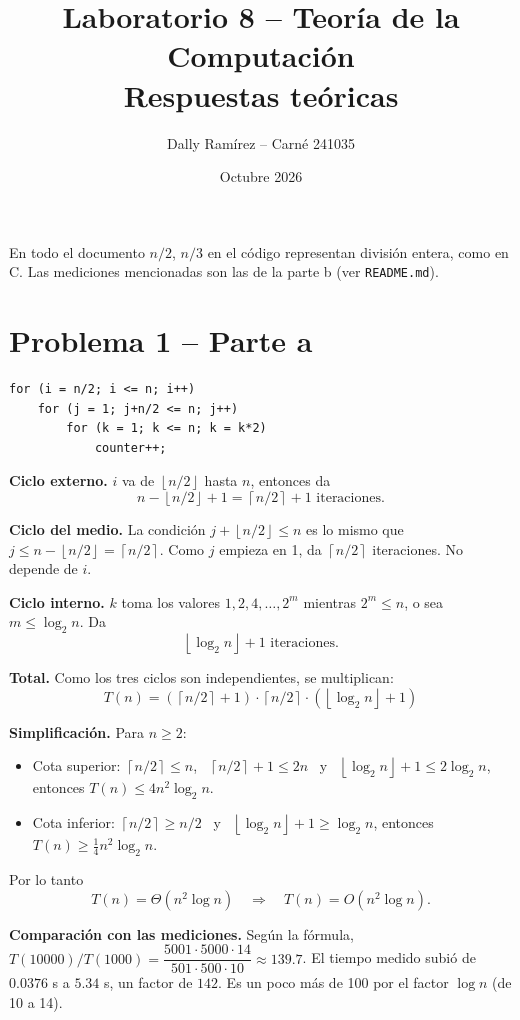\documentclass[11pt]{article}
\title{Laboratorio 8 -- Teoría de la Computación\\\large Respuestas teóricas}
\author{Dally Ramírez -- Carné 241035}
\date{Octubre 2026}
\newcommand{\floor}[1]{\left\lfloor #1 \right\rfloor}
\newcommand{\ceil}[1]{\left\lceil #1 \right\rceil}
\begin{document}
\maketitle

En todo el documento $n/2$, $n/3$ en el código representan división entera, como en C. Las mediciones mencionadas son las de la parte b (ver \texttt{README.md}).

\section*{Problema 1 -- Parte a}

\begin{verbatim}
for (i = n/2; i <= n; i++)
    for (j = 1; j+n/2 <= n; j++)
        for (k = 1; k <= n; k = k*2)
            counter++;
\end{verbatim}

\textbf{Ciclo externo.} $i$ va de $\floor{n/2}$ hasta $n$, entonces da
\[
n - \floor{n/2} + 1 = \ceil{n/2} + 1 \text{ iteraciones.}
\]

\textbf{Ciclo del medio.} La condición $j + \floor{n/2} \le n$ es lo mismo que $j \le n - \floor{n/2} = \ceil{n/2}$. Como $j$ empieza en 1, da $\ceil{n/2}$ iteraciones. No depende de $i$.

\textbf{Ciclo interno.} $k$ toma los valores $1, 2, 4, \dots, 2^m$ mientras $2^m \le n$, o sea $m \le \log_2 n$. Da
\[
\floor{\log_2 n} + 1 \text{ iteraciones.}
\]

\textbf{Total.} Como los tres ciclos son independientes, se multiplican:
\[
T(n) = \left(\ceil{n/2}+1\right)\cdot\ceil{n/2}\cdot\left(\floor{\log_2 n}+1\right)
\]

\textbf{Simplificación.} Para $n \ge 2$:
\begin{itemize}
  \item Cota superior: $\ceil{n/2} \le n$, \ $\ceil{n/2}+1 \le 2n$ \ y \ $\floor{\log_2 n}+1 \le 2\log_2 n$, entonces $T(n) \le 4n^2\log_2 n$.
  \item Cota inferior: $\ceil{n/2} \ge n/2$ \ y \ $\floor{\log_2 n}+1 \ge \log_2 n$, entonces $T(n) \ge \tfrac{1}{4} n^2 \log_2 n$.
\end{itemize}
Por lo tanto
\[
\boxed{T(n) = \Theta(n^2 \log n)} \quad\Rightarrow\quad T(n) = O(n^2\log n).
\]

\textbf{Comparación con las mediciones.} Según la fórmula, $T(10000)/T(1000) = \dfrac{5001\cdot 5000\cdot 14}{501\cdot 500\cdot 10} \approx 139.7$. El tiempo medido subió de $0.0376$ s a $5.34$ s, un factor de $142$. Es un poco más de 100 por el factor $\log n$ (de 10 a 14).
\end{document}
